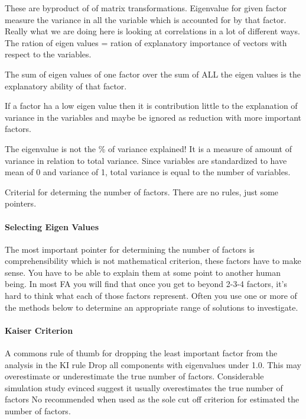 \documentclass[]{book}
\let\oldparagraph\paragraph
\renewcommand{\paragraph}[1]{\oldparagraph{#1}\mbox{}}
\theoremstyle{definition}
\theoremstyle{definition}
\theoremstyle{definition}
\theoremstyle{remark}
\begin{document}
These are byproduct of of matrix transformations. Eigenvalue for given
factor measure the variance in all the variable which is accounted for
by that factor. Really what we are doing here is looking at correlations
in a lot of different ways. The ration of eigen values = ration of
explanatory importance of vectors with respect to the variables.

The sum of eigen values of one factor over the sum of ALL the eigen
values is the explanatory ability of that factor.

If a factor ha a low eigen value then it is contribution little to the
explanation of variance in the variables and maybe be ignored as
reduction with more important factors.

The eigenvalue is not the \% of variance explained! It is a measure of
amount of variance in relation to total variance. Since variables are
standardized to have mean of 0 and variance of 1, total variance is
equal to the number of variables.

Criterial for determing the number of factors. There are no rules, just
some pointers.

\paragraph{Selecting Eigen Values}\label{selecting-eigen-values}

The most important pointer for determining the number of factors is
comprehensibility which is not mathematical criterion, these factors
have to make sense. You have to be able to explain them at some point to
another human being. In most FA you will find that once you get to
beyond 2-3-4 factors, it's hard to think what each of those factors
represent. Often you use one or more of the methods below to determine
an appropriate range of solutions to investigate.

\paragraph{Kaiser Criterion}\label{kaiser-criterion}

A commons rule of thumb for dropping the least important factor from the
analysis in the KI rule Drop all components with eigenvalues under 1.0.
This may overestimate or underestimate the true number of factors.
Considerable simulation study evinced suggest it usually overestimates
the true number of factors No recommended when used as the sole cut off
criterion for estimated the number of factors.
\end{document}
